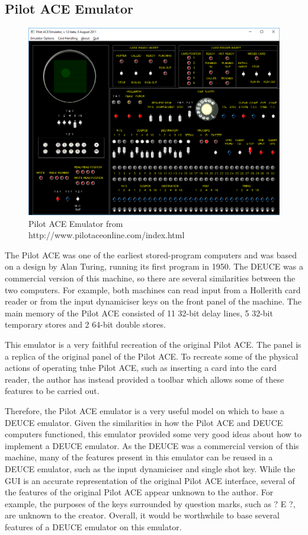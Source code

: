 \documentclass{l4proj}
\begin{document}
\subsection{Pilot ACE Emulator} 
\begin{figure}[h!]
	\centering
	\includegraphics[width=0.7\linewidth]{images/ace-emulator}
	\caption{Pilot ACE Emulator from http://www.pilotaceonline.com/index.html}
	\label{fig:ace}
\end{figure}
The Pilot ACE was one of the earliest stored-program computers and was based on a design by Alan Turing, running its first program in 1950. The DEUCE was a commercial version of this machine, so there are several similarities between the two computers. For example, both machines can read input from a Hollerith card reader or from the input dynamiciser keys on the front panel of the machine. The main memory of the Pilot ACE consisted of 11 32-bit delay lines, 5 32-bit temporary stores and 2 64-bit double stores.

This emulator is a very faithful recreation of the original Pilot ACE. The panel is a replica of the original panel of the Pilot ACE. To recreate some of the physical actions of operating tnhe Pilot ACE, such as inserting a card into the card reader, the author has instead provided a toolbar which allows some of these features to be carried out.

Therefore, the Pilot ACE emulator is a very useful model on which to base a DEUCE emulator. Given the similarities in how the Pilot ACE and DEUCE computers functioned, this emulator provided some very good ideas about how to implement a DEUCE emulator. As the DEUCE was a commercial version of this machine, many of the features present in this emulator can be reused in a DEUCE emulator, such as the input dynamiciser and single shot key. While the GUI is an accurate representation of the original Pilot ACE interface, several of the features of the original Pilot ACE appear unknown to the author. For example, the purposes of the keys surrounded by question marks, such as ? E ?, are unknown to the creator. Overall, it would be worthwhile to base several features of a DEUCE emulator on this emulator.
\end{document}
